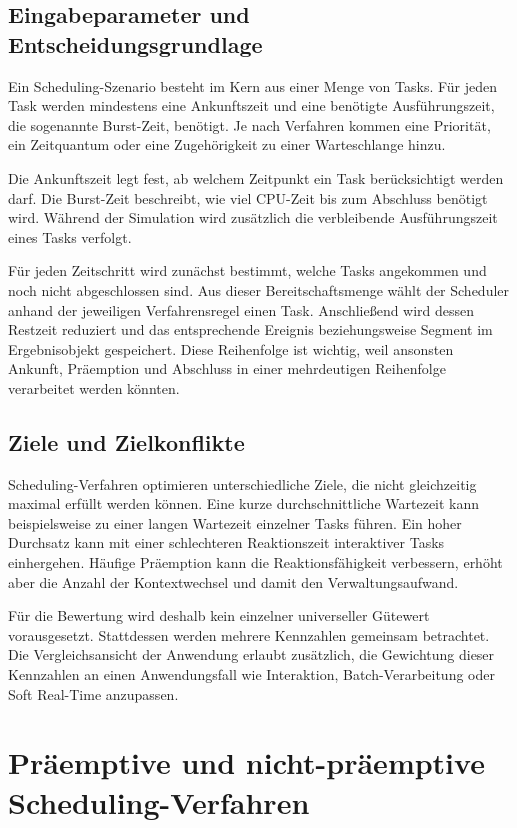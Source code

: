 \subsection{Eingabeparameter und Entscheidungsgrundlage}

Ein Scheduling-Szenario besteht im Kern aus einer Menge von Tasks. Für jeden Task werden mindestens eine Ankunftszeit und eine benötigte Ausführungszeit, die sogenannte Burst-Zeit, benötigt. Je nach Verfahren kommen eine Priorität, ein Zeitquantum oder eine Zugehörigkeit zu einer Warteschlange hinzu.

Die Ankunftszeit legt fest, ab welchem Zeitpunkt ein Task berücksichtigt werden darf. Die Burst-Zeit beschreibt, wie viel CPU-Zeit bis zum Abschluss benötigt wird. Während der Simulation wird zusätzlich die verbleibende Ausführungszeit eines Tasks verfolgt.

Für jeden Zeitschritt wird zunächst bestimmt, welche Tasks angekommen und noch nicht abgeschlossen sind. Aus dieser Bereitschaftsmenge wählt der Scheduler anhand der jeweiligen Verfahrensregel einen Task. Anschließend wird dessen Restzeit reduziert und das entsprechende Ereignis beziehungsweise Segment im Ergebnisobjekt gespeichert. Diese Reihenfolge ist wichtig, weil ansonsten Ankunft, Präemption und Abschluss in einer mehrdeutigen Reihenfolge verarbeitet werden könnten.

\subsection{Ziele und Zielkonflikte}

Scheduling-Verfahren optimieren unterschiedliche Ziele, die nicht gleichzeitig maximal erfüllt werden können. Eine kurze durchschnittliche Wartezeit kann beispielsweise zu einer langen Wartezeit einzelner Tasks führen. Ein hoher Durchsatz kann mit einer schlechteren Reaktionszeit interaktiver Tasks einhergehen. Häufige Präemption kann die Reaktionsfähigkeit verbessern, erhöht aber die Anzahl der Kontextwechsel und damit den Verwaltungsaufwand.

Für die Bewertung wird deshalb kein einzelner universeller Gütewert vorausgesetzt. Stattdessen werden mehrere Kennzahlen gemeinsam betrachtet. Die Vergleichsansicht der Anwendung erlaubt zusätzlich, die Gewichtung dieser Kennzahlen an einen Anwendungsfall wie Interaktion, Batch-Verarbeitung oder Soft Real-Time anzupassen.

\section{Präemptive und nicht-präemptive Scheduling-Verfahren}

